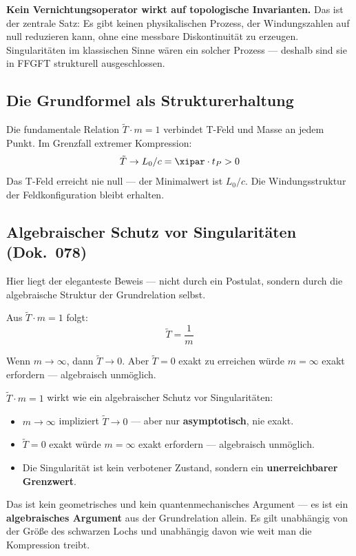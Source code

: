 \begin{erkenntnis}
\textbf{Kein Vernichtungsoperator wirkt auf topologische Invarianten.} Das ist der zentrale Satz: Es gibt keinen physikalischen Prozess, der Windungszahlen auf null reduzieren kann, ohne eine messbare Diskontinuität zu erzeugen. Singularitäten im klassischen Sinne wären ein solcher Prozess --- deshalb sind sie in FFGFT strukturell ausgeschlossen.
\end{erkenntnis}

\subsection{Die Grundformel als Strukturerhaltung}

Die fundamentale Relation $\tilde{T} \cdot m = 1$ verbindet T-Feld und Masse an jedem Punkt. Im Grenzfall extremer Kompression:
\begin{equation}
  \tilde{T} \rightarrow L_0/c = \xipar \cdot t_P > 0
\end{equation}
Das T-Feld erreicht nie null --- der Minimalwert ist $L_0/c$. Die Windungsstruktur der Feldkonfiguration bleibt erhalten.

\subsection{Algebraischer Schutz vor Singularitäten (Dok.~078)}

Hier liegt der eleganteste Beweis --- nicht durch ein Postulat, sondern durch die algebraische Struktur der Grundrelation selbst.

Aus $\tilde{T} \cdot m = 1$ folgt:
\begin{equation}
  \tilde{T} = \frac{1}{m}
\end{equation}

Wenn $m \rightarrow \infty$, dann $\tilde{T} \rightarrow 0$. Aber $\tilde{T} = 0$ exakt zu erreichen würde $m = \infty$ exakt erfordern --- algebraisch unmöglich.

\begin{keyresult}
$\tilde{T} \cdot m = 1$ wirkt wie ein algebraischer Schutz vor Singularitäten:
\begin{itemize}
  \item $m \rightarrow \infty$ impliziert $\tilde{T} \rightarrow 0$ --- aber nur \textbf{asymptotisch}, nie exakt.
  \item $\tilde{T} = 0$ exakt würde $m = \infty$ exakt erfordern --- algebraisch unmöglich.
  \item Die Singularität ist kein verbotener Zustand, sondern ein \textbf{unerreichbarer Grenzwert}.
\end{itemize}
Das ist kein geometrisches und kein quantenmechanisches Argument --- es ist ein \textbf{algebraisches Argument} aus der Grundrelation allein. Es gilt unabhängig von der Größe des schwarzen Lochs und unabhängig davon wie weit man die Kompression treibt.
\end{keyresult}

